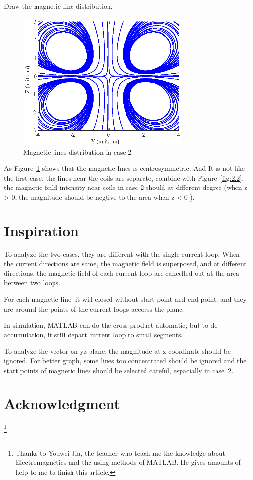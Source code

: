 \documentclass[10pt, journal, final]{IEEEtran}
\begin{document}
Draw the magnetic line distribution.


\begin{figure}[htbp]
    \centering
    \includegraphics[width = 3.4in]{figures-3/work2.3.eps}
    \caption{Magnetic lines distribution in case 2}
    \label{fig:2.3}
\end{figure}

As Figure~\ref{fig:2.3} shows that the magnetic lines is centrosymmetric. And It is not like the first case, 
the lines near the coils are separate, combine with Figure~\ref{fig:2.2},
the magnetic feild intensity near coils in case 2 should at different degree (when z > 0, the magnitude should be negtive to 
the area when z < 0 ).
\section{
  Inspiration
 }
\label{sec: Ins}
To analyze the two cases, they are different with the single current loop. When the current directions are same, 
the magnetic field is superposed, and at different directions, the magnetic field of each current loop are cancelled out 
at the area between two loops.\par
For each magnetic line, it will closed without start point and end point, and they are around the points of 
the current loops accorss the plane.\par
In simulation, MATLAB can do the cross product automatic, but to do accumulation, it still depart current loop to small 
segments.\par
To analyze the vector on yz plane, the magnitude at x coordinate should be ignored. For better graph, 
some lines too concentrated should be ignored and the start points of magnetic lines should be selected careful, 
espacially in case~2. 



\section*{Acknowledgment}
\thanks{
    Thanks to Youwei Jia, the teacher who teach me the knowledge about Electromagnetics
    and the using methods of MATLAB. He gives amounts of help to me to finish this article.
}
\end{document}
